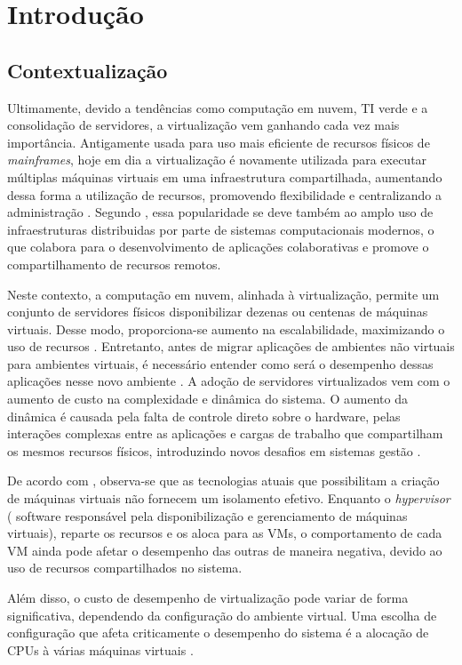 \chapter{Introdução}
\section{Contextualizaç\~ao}
Ultimamente, devido a tendências como computação em nuvem, TI verde e a consolidação de servidores, a virtualização vem ganhando cada vez mais importância. Antigamente usada para uso mais eficiente de recursos físicos de \textit{mainframes}, hoje em dia a virtualização é novamente utilizada para executar múltiplas máquinas virtuais em uma infraestrutura compartilhada, aumentando dessa forma a utilização de recursos, promovendo flexibilidade e centralizando a administração \cite{huber2011}. Segundo , essa popularidade se deve também ao amplo uso de infraestruturas distribuidas por parte de sistemas computacionais modernos, o que colabora para o desenvolvimento de aplicações colaborativas e promove o compartilhamento de recursos remotos.

Neste contexto, a computação em nuvem, alinhada à virtualização, permite um conjunto de servidores físicos disponibilizar dezenas ou centenas de máquinas virtuais. Desse modo, proporciona-se aumento na escalabilidade, maximizando o uso de recursos  \cite{popiolek2012}. Entretanto, antes de migrar aplicações de ambientes não virtuais para ambientes virtuais, é necessário entender como será o desempenho dessas aplicações nesse novo ambiente \cite{benevuto2006}. A adoção de servidores virtualizados vem com o aumento de custo na complexidade e dinâmica do sistema. O aumento da dinâmica é causada pela falta de controle direto sobre o hardware, pelas interações complexas entre as aplicações e cargas de trabalho que compartilham os mesmos recursos físicos, introduzindo novos desafios em sistemas gestão \cite{huber2011}.

De acordo com , observa-se que as tecnologias atuais que possibilitam a criação de máquinas virtuais não fornecem um isolamento efetivo. Enquanto o \textit{hypervisor} ( software responsável pela disponibilização e gerenciamento de máquinas virtuais), reparte os recursos e os aloca para as VMs, o comportamento de cada VM ainda pode afetar o desempenho das outras de maneira negativa, devido ao uso de recursos compartilhados no sistema.  

Além disso, o custo de desempenho de virtualização pode variar de forma significativa, dependendo da configuração do ambiente virtual. Uma escolha de configuração que afeta criticamente o desempenho do sistema é a alocação de CPUs à várias máquinas virtuais     \cite{benevuto2006}.

